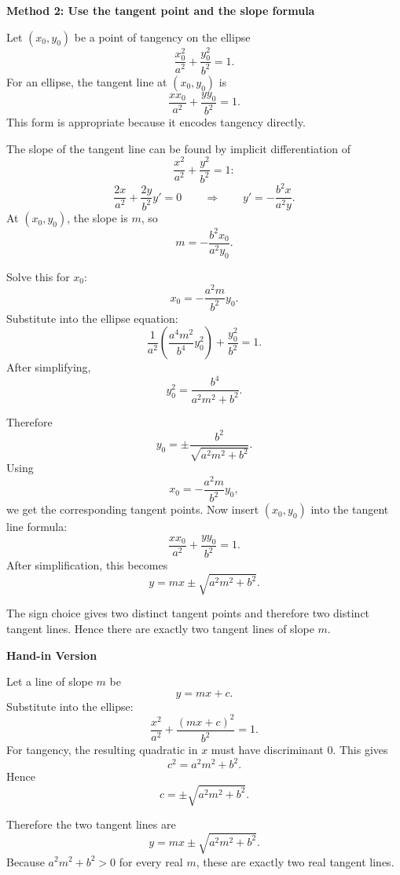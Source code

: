 \documentclass[a4paper,12pt,twocolumn]{article}
\newenvironment{solutionbox}{\begin{framed}}{\end{framed}}
\begin{document}
\begin{solutionbox}
\textbf{Method 2: Use the tangent point and the slope formula}

\begin{steps}
\item Let \((x_0,y_0)\) be a point of tangency on the ellipse
\[
\frac{x_0^2}{a^2}+\frac{y_0^2}{b^2}=1.
\]
For an ellipse, the tangent line at \((x_0,y_0)\) is
\[
\frac{xx_0}{a^2}+\frac{yy_0}{b^2}=1.
\]
This form is appropriate because it encodes tangency directly.

\item The slope of the tangent line can be found by implicit differentiation of
\[
\frac{x^2}{a^2}+\frac{y^2}{b^2}=1:
\]
\[
\frac{2x}{a^2}+\frac{2y}{b^2}y'=0
\qquad\Longrightarrow\qquad
y'=-\frac{b^2x}{a^2y}.
\]
At \((x_0,y_0)\), the slope is \(m\), so
\[
m=-\frac{b^2x_0}{a^2y_0}.
\]

\item Solve this for \(x_0\):
\[
x_0=-\frac{a^2m}{b^2}y_0.
\]
Substitute into the ellipse equation:
\[
\frac{1}{a^2}\left(\frac{a^4m^2}{b^4}y_0^2\right)+\frac{y_0^2}{b^2}=1.
\]
After simplifying,
\[
y_0^2=\frac{b^4}{a^2m^2+b^2}.
\]

\item Therefore
\[
y_0=\pm\frac{b^2}{\sqrt{a^2m^2+b^2}}.
\]
Using
\[
x_0=-\frac{a^2m}{b^2}y_0,
\]
we get the corresponding tangent points. Now insert \((x_0,y_0)\) into the tangent line formula:
\[
\frac{xx_0}{a^2}+\frac{yy_0}{b^2}=1.
\]
After simplification, this becomes
\[
y=mx\pm\sqrt{a^2m^2+b^2}.
\]

\item The sign choice gives two distinct tangent points and therefore two distinct tangent lines. Hence there are exactly two tangent lines of slope \(m\).
\end{steps}
\end{solutionbox}

\begin{solutionbox}
\textbf{Hand-in Version}

Let a line of slope \(m\) be
\[
y=mx+c.
\]
Substitute into the ellipse:
\[
\frac{x^2}{a^2}+\frac{(mx+c)^2}{b^2}=1.
\]
For tangency, the resulting quadratic in \(x\) must have discriminant \(0\). This gives
\[
c^2=a^2m^2+b^2.
\]
Hence
\[
c=\pm\sqrt{a^2m^2+b^2}.
\]

Therefore the two tangent lines are
\[
\boxed{y=mx\pm\sqrt{a^2m^2+b^2}.}
\]
Because \(a^2m^2+b^2>0\) for every real \(m\), these are exactly two real tangent lines.
\end{solutionbox}
\end{document}
